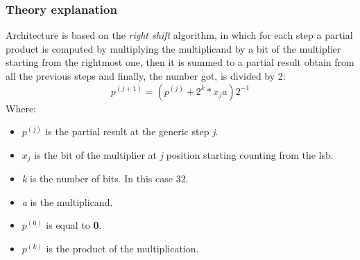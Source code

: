 \subsubsection{Theory explanation}
Architecture is based on the \textit{right shift} algorithm, in which for each step a partial product is computed by multiplying the multiplicand by a bit of the multiplier starting from the rightmost one, then it is summed to a partial result obtain from all the previous steps and finally, the number got, is divided by 2:
\begin{equation}
    p^{(j+1)}=(p^{(j)}+2^k*x_ja)2^{-1}
\end{equation}
Where:
\begin{itemize}
    \item \textit{$p^{(j)}$} is the partial result at the generic step \textit{j}.
    \item \textit{$x_j$} is the bit of the multiplier at \textit{j} position starting counting from the lsb.
    \item \textit{k} is the number of bits. In this case 32.
    \item \textit{a} is the multiplicand.
    \item \textit{$p^{(0)}$} is equal to \textbf{0}.
    \item \textit{$p^{(k)}$} is the product of the multiplication.
\end{itemize}
